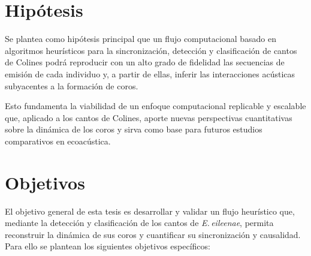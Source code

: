 \section{Hipótesis}
\label{sec:hipotesis}

Se plantea como hipótesis principal que un flujo computacional 
basado en algoritmos heurísticos para la sincronización, 
detección y clasificación de cantos de Colines podrá reproducir con un alto 
grado de fidelidad las secuencias de emisión de cada individuo 
y, a partir de ellas, inferir las interacciones acústicas 
subyacentes a la formación de coros. 


Esto fundamenta la 
viabilidad de un enfoque computacional replicable y escalable 
que, aplicado a los cantos de Colines, aporte 
nuevas perspectivas cuantitativas sobre la dinámica de los coros 
y sirva como base para futuros estudios comparativos en 
ecoacústica.  


\section{Objetivos}
\label{sec:objetivos}

El objetivo general de esta tesis es desarrollar y 
validar un flujo heurístico que, mediante la detección y 
clasificación de los cantos de \emph{E.\,eileenae}, permita 
reconstruir la dinámica de sus coros y cuantificar su 
sincronización y causalidad.
Para ello se plantean los siguientes objetivos específicos:

